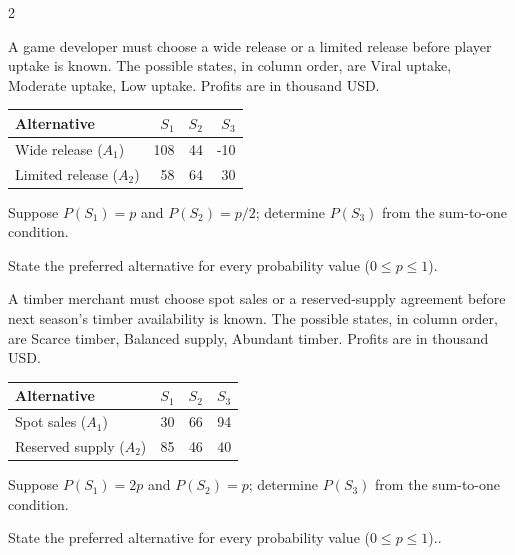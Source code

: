 \begin{multicols}{2}
\begin{minipage}{\linewidth}
A game developer must choose a wide release or a limited release before player uptake is known. The possible states, in column order, are Viral uptake, Moderate uptake, Low uptake. Profits are in thousand USD.
\begin{center}\small\setlength{\tabcolsep}{4pt}
\begin{tabular}{@{}lrrr@{}}\toprule
Alternative&$S_1$&$S_2$&$S_3$\\\midrule
Wide release ($A_1$)&108&44&-10\\
Limited release ($A_2$)&58&64&30\\\bottomrule
\end{tabular}\end{center}
Suppose $P(S_1)=p$ and $P(S_2)=p/2$; determine $P(S_3)$ from the sum-to-one condition.

State the preferred alternative for every probability value ($0\le p\le1$). 
\end{minipage}\par

\begin{minipage}{\linewidth}
A timber merchant must choose spot sales or a reserved-supply agreement before next season's timber availability is known. The possible states, in column order, are Scarce timber, Balanced supply, Abundant timber. Profits are in thousand USD.
\begin{center}\small\setlength{\tabcolsep}{4pt}
\begin{tabular}{@{}lrrr@{}}\toprule
Alternative&$S_1$&$S_2$&$S_3$\\\midrule
Spot sales ($A_1$)&30&66&94\\
Reserved supply ($A_2$)&85&46&40\\\bottomrule
\end{tabular}\end{center}
Suppose $P(S_1)=2p$ and $P(S_2)=p$; determine $P(S_3)$ from the sum-to-one condition.

State the preferred alternative for every probability value ($0\le p\le1$).. 
\end{minipage}\par
\end{multicols}

